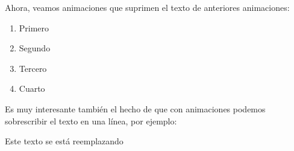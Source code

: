 \documentclass[a4paper,10pt]{beamer}
\begin{document}
 \begin{frame}
 
 Ahora, veamos animaciones que suprimen el texto de anteriores
 animaciones:
 
  
   \begin{enumerate} [<+>]
  \item Primero
  \item Segundo
  \item Tercero
  \item Cuarto
 \end{enumerate}
  
\end{frame}

\begin{frame}
 
 Es muy interesante tambi\'en el hecho de que con animaciones
 podemos sobrescribir el texto en una l\'inea, por ejemplo:
 
 \vspace{0.4cm}
 
  {\Large{Este}}
  {\Large{texto}}
  {\Large{se}}
  {\Large{est\'a}}
  {\Large{reemplazando}}
  {\Large{\Smiley{}}}
 
\end{frame}
\end{document}
